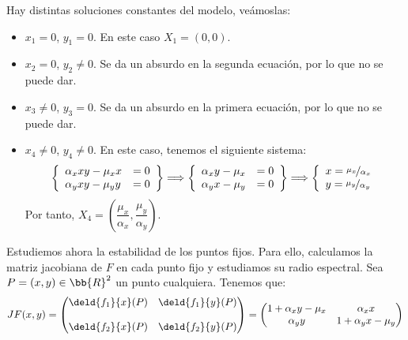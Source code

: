 \begin{ejercicio}
    Hay distintas soluciones constantes del modelo, veámoslas:
    \begin{itemize}
        \item $x_1=0$, $y_1=0$. En este caso $X_1=(0,0)$.
        \item $x_2=0$, $y_2\neq 0$. Se da un absurdo en la segunda ecuación, por lo que no se puede dar.
        \item $x_3\neq 0$, $y_3=0$. Se da un absurdo en la primera ecuación, por lo que no se puede dar.
        \item $x_4\neq 0$, $y_4\neq 0$. En este caso, tenemos el siguiente sistema:
        \begin{equation*}
            \left\{
                \begin{array}{lr}
                    \alpha_x xy - \mu_x x &=0\\
                    \alpha_y xy - \mu_y y &=0
                \end{array}
            \right\}
            \Longrightarrow
            \left\{
                \begin{array}{lr}
                    \alpha_x y - \mu_x &=0\\
                    \alpha_y x - \mu_y &=0
                \end{array}
            \right\}
            \Longrightarrow
            \left\{
                \begin{array}{l}
                    x=\nicefrac{\mu_x}{\alpha_x}\\
                    y=\nicefrac{\mu_y}{\alpha_y}
                \end{array}
            \right.
        \end{equation*}
        Por tanto, $X_4=\left(\dfrac{\mu_x}{\alpha_x},\dfrac{\mu_y}{\alpha_y}\right)$.
    \end{itemize}

    Estudiemos ahora la estabilidad de los puntos fijos. Para ello,
    calculamos la matriz jacobiana de $F$ en cada punto fijo y estudiamos
    su radio espectral. Sea $P=(x,y)\in \bb{R}^2$ un punto cualquiera. Tenemos que:
    \begin{equation*}
        JF(x,y) = \begin{pmatrix}
            \deld{f_1}{x}(P) & \deld{f_1}{y}(P)\\ \\
            \deld{f_2}{x}(P) & \deld{f_2}{y}(P)
        \end{pmatrix}
        = \begin{pmatrix}
            1 + \alpha_x y - \mu_x & \alpha_x x\\
            \alpha_y y & 1 + \alpha_y x - \mu_y
        \end{pmatrix}
    \end{equation*}


\end{ejercicio}
